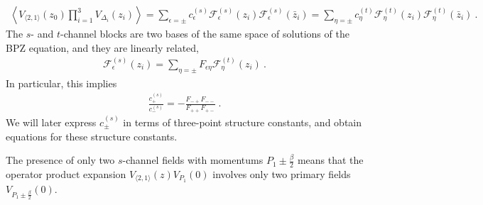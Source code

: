 \documentclass[12pt, a4paper]{article}
\theoremstyle{break}
\begin{document}
\begin{align}
 \left< V_{\langle 2, 1 \rangle}(z_0) \prod_{i=1}^3 V_{\Delta_i}(z_i) \right> = \sum_{\epsilon=\pm} c^{(s)}_{\epsilon} \mathcal{F}^{(s)}_{\epsilon}(z_i) \mathcal{F}^{(s)}_{\epsilon}(\bar z_i) = \sum_{\eta=\pm} c^{(t)}_{\eta} \mathcal{F}^{(t)}_{\eta}(z_i) \mathcal{F}^{(t)}_{\eta}(\bar z_i)\ .
 \label{gz}
\end{align}
The $s$- and $t$-channel blocks are two bases of the same space of solutions of the BPZ equation, and they are linearly related,
\begin{align}
 \mathcal{F}^{(s)}_{\epsilon}(z_i) = \sum_{\eta=\pm} F_{\epsilon\eta} \mathcal{F}^{(t)}_{\eta}(z_i)\ .
\end{align}
In particular, this implies 
\begin{align}
 \frac{c_{+}^{(s)}}{c_{-}^{(s)}} = -\frac{F_{-+}F_{--}}{F_{++}F_{+-}} \ .
 \label{eq:coc}
\end{align}
We will later express $c_\pm^{(s)}$ in terms of three-point structure constants, and obtain equations for these structure constants.

The presence of only two $s$-channel fields with momentums $P_1\pm \frac{\beta}{2}$ means that the operator product expansion $V_{\langle 2, 1 \rangle}(z) V_{P_1}(0)$ involves only two primary fields $V_{P_1\pm \frac{\beta}{2}}(0)$. 
\end{document}
